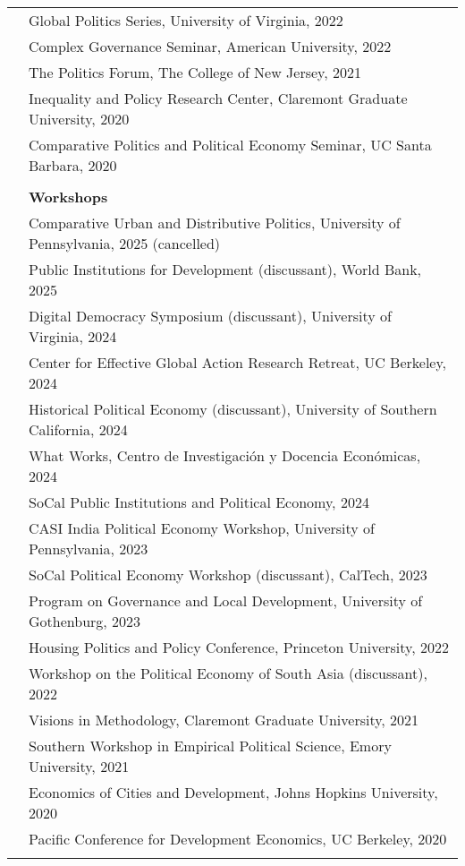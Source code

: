 \documentclass[letterpaper, 10.5pt]{article}
\begin{document}
\begin{longtable}{p{1.5in}p{5in}}
 &Global Politics Series, University of Virginia, 2022\\
&Complex Governance Seminar, American University, 2022\\
&The Politics Forum, The College of New Jersey, 2021\\
 &Inequality and Policy Research Center, Claremont Graduate University, 2020\\
 & Comparative Politics and Political Economy Seminar, UC Santa Barbara, 2020\\
&\\
& \textbf{Workshops}\\ 
& Comparative Urban and Distributive Politics, University of Pennsylvania, 2025 (cancelled)\\
& Public Institutions for Development (discussant), World Bank, 2025\\
& Digital Democracy Symposium (discussant), University of Virginia, 2024\\
& Center for Effective Global Action Research Retreat, UC Berkeley, 2024\\
& Historical Political Economy (discussant), University of Southern California, 2024\\
&What Works, Centro de Investigaci\'{o}n y Docencia Econ\'{o}micas, 2024\\


& SoCal Public Institutions and Political Economy, 2024\\ & CASI India Political Economy Workshop, University of Pennsylvania, 2023\\     

&SoCal Political Economy Workshop (discussant), CalTech, 2023\\
 &Program on Governance and Local Development, University of Gothenburg, 2023\\

           &Housing Politics and Policy Conference, Princeton University, 2022\\
 & Workshop on the Political Economy of South Asia (discussant), 2022\\        



  & Visions in Methodology, Claremont Graduate University, 2021 \\
  
    &Southern Workshop in Empirical Political Science, Emory University, 2021 \\
 

 & Economics of Cities and Development, Johns Hopkins University, 2020\\
 & Pacific Conference for Development Economics, UC Berkeley, 2020 \\
 &\\



\end{longtable}
\end{document}
